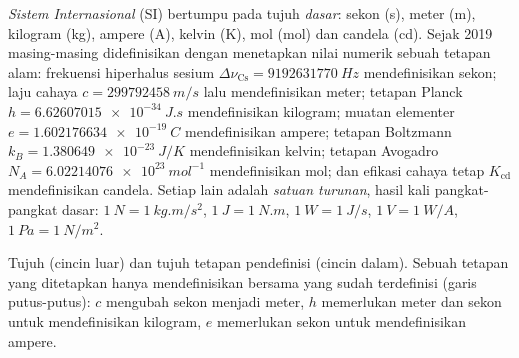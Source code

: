\begin{definition}\label{def:b1:units-dimensions:si}
\emph{Sistem  Internasional} (SI) bertumpu pada tujuh
\emph{ dasar}: sekon (\unit{s}), meter (\unit{m}),
kilogram (\unit{kg}), ampere (\unit{A}), kelvin (\unit{K}),
mol (\unit{mol}) dan candela (\unit{cd}). Sejak 2019 masing-masing
didefinisikan dengan menetapkan nilai numerik sebuah tetapan alam:
frekuensi hiperhalus sesium $\Delta\nu_{\mathrm{Cs}} = \qty{9192631770}{Hz}$
mendefinisikan sekon; laju cahaya $c = \qty{299792458}{m/s}$ lalu
mendefinisikan meter; tetapan Planck
$h = \qty{6.62607015e-34}{J.s}$ mendefinisikan kilogram; muatan
elementer $e = \qty{1.602176634e-19}{C}$ mendefinisikan ampere; tetapan Boltzmann
$k_B = \qty{1.380649e-23}{J/K}$ mendefinisikan kelvin; tetapan Avogadro
$N_A = \qty{6.02214076e23}{mol^{-1}}$ mendefinisikan mol; dan efikasi
cahaya tetap $K_{\mathrm{cd}}$ mendefinisikan candela. Setiap  lain adalah
\emph{satuan turunan}, hasil kali pangkat-pangkat
 dasar: $\qty{1}{N} = \qty{1}{kg.m/s^2}$, $\qty{1}{J} = \qty{1}{N.m}$,
$\qty{1}{W} = \qty{1}{J/s}$, $\qty{1}{V} = \qty{1}{W/A}$,
$\qty{1}{Pa} = \qty{1}{N/m^2}$.
\end{definition}

\begin{omfigure}

{\small Tujuh  (cincin luar) dan tujuh tetapan
pendefinisi (cincin dalam). Sebuah tetapan yang ditetapkan hanya
mendefinisikan  bersama  yang sudah terdefinisi (garis
putus-putus): $c$ mengubah sekon menjadi meter, $h$ memerlukan meter
dan sekon untuk mendefinisikan kilogram, $e$ memerlukan sekon untuk
mendefinisikan ampere.}
\end{omfigure}

